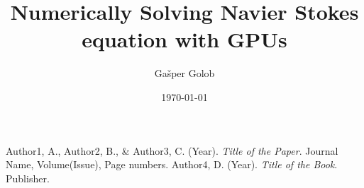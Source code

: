 \documentclass[12pt]{article}
\title{Numerically Solving Navier Stokes equation with GPUs}
\author{Gašper Golob}
\date{\today}
\begin{document}
\maketitle

\begin{thebibliography}{99}
     Author1, A., Author2, B., \& Author3, C. (Year). \textit{Title of the Paper}. Journal Name, Volume(Issue), Page numbers.
     Author4, D. (Year). \textit{Title of the Book}. Publisher.
\end{thebibliography}
\end{document}
